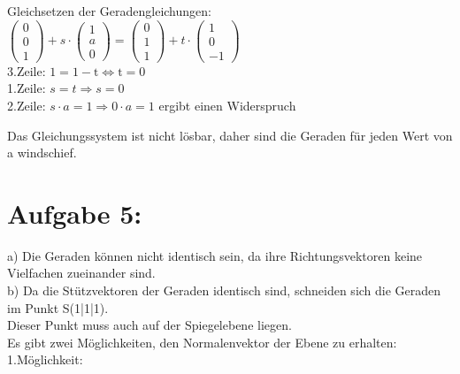 \documentclass[10pt]{article}
\begin{document}
Gleichsetzen der Geradengleichungen:\\
$\left(\begin{array}{l}0 \\ 0 \\ 1\end{array}\right)+s \cdot\left(\begin{array}{l}1 \\ a \\ 0\end{array}\right)=\left(\begin{array}{l}0 \\ 1 \\ 1\end{array}\right)+t \cdot\left(\begin{array}{c}1 \\ 0 \\ -1\end{array}\right)$\\
3.Zeile: $1=1-\mathrm{t} \Leftrightarrow \mathrm{t}=0$\\
1.Zeile: $s=t \Rightarrow s=0$\\
2.Zeile: $s \cdot a=1 \Rightarrow 0 \cdot a=1$ ergibt einen Widerspruch

Das Gleichungssystem ist nicht lösbar, daher sind die Geraden für jeden Wert von a windschief.

\section*{Aufgabe 5:}
a) Die Geraden können nicht identisch sein, da ihre Richtungsvektoren keine Vielfachen zueinander sind.\\
b) Da die Stützvektoren der Geraden identisch sind, schneiden sich die Geraden im Punkt S(1|1|1).\\
Dieser Punkt muss auch auf der Spiegelebene liegen.\\
Es gibt zwei Möglichkeiten, den Normalenvektor der Ebene zu erhalten:\\
1.Möglichkeit:
\end{document}
